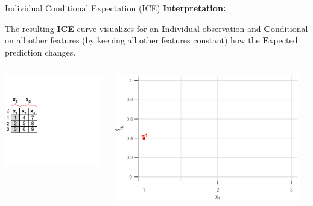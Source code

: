 \documentclass[11pt,compress,t,notes=noshow, aspectratio=169, xcolor=table]{beamer}
\begin{document}
\begin{vbframe}{Individual Conditional Expectation (ICE)}
\textbf{Interpretation:}

The resulting \textbf{ICE} curve visualizes for an \textbf{I}ndividual observation and \textbf{C}onditional on all other features (by keeping all other features constant) how the \textbf{E}xpected prediction changes.

\framebreak




\begin{columns}[T]
\begin{column}{0.45\textwidth}
\includegraphics[page=6, trim=0cm 0.35cm 0.85cm 0.35cm, width=\textwidth]{figure_man/ice_plot_demo}
\end{column}
\begin{column}{0.55\textwidth}
\includegraphics[page=4, width=0.95\textwidth]{figure/ICE}
\end{column}
\end{columns}
\vspace*{\topsep}


\end{vbframe}
\end{document}
